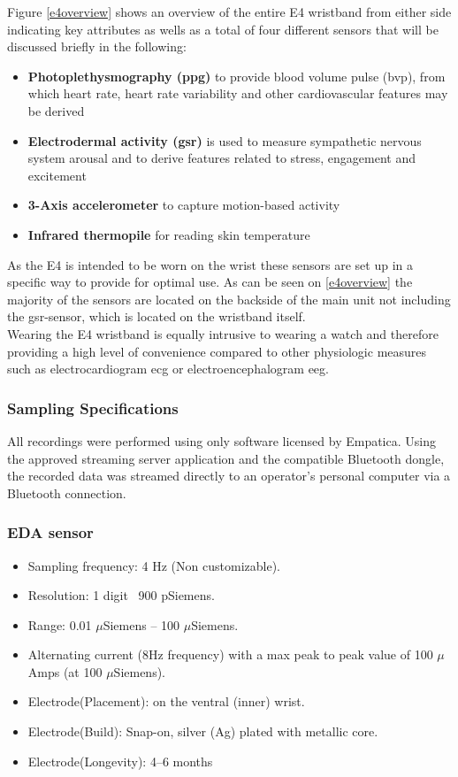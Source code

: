 Figure \ref{e4overview} shows an overview of the entire E4 wristband from either side indicating key attributes as wells as a total of four different sensors that will be discussed briefly in the following:

\begin{itemize}
\item \textbf{Photoplethysmography (\gls{ppg})} to provide blood volume pulse (\gls{bvp}), from which heart rate, heart rate variability and other cardiovascular features may be derived
\item \textbf{Electrodermal activity (\gls{gsr})} is used to measure sympathetic nervous system arousal and to derive features related to stress, engagement and excitement
\item \textbf{3-Axis accelerometer} to capture motion-based activity
\item \textbf{Infrared thermopile} for reading skin temperature
\end{itemize}

As the E4 is intended to be worn on the wrist these sensors are set up in a specific way to provide for optimal use. As can be seen on \ref{e4overview} the majority of the sensors are located on the backside of the main unit not including the \gls{gsr}-sensor, which is located on the wristband itself.\\
Wearing the E4 wristband is equally intrusive to wearing a watch and therefore providing a high level of convenience compared to other physiologic measures such as electrocardiogram \gls{ecg} or electroencephalogram \gls{eeg}.\\

\subsubsection{Sampling Specifications}
All recordings were performed using only software licensed by Empatica. Using the approved streaming server application and the compatible Bluetooth dongle, the recorded data was streamed directly to an operator's personal computer via a Bluetooth connection. 

\subsubsection{EDA sensor}
\begin{itemize}
\item Sampling frequency: 4 Hz (Non customizable).
\item Resolution: 1 digit ~900 pSiemens.
\item Range: 0.01 $\mu$Siemens – 100 $\mu$Siemens.
\item Alternating current (8Hz frequency) with a
max peak to peak value of 100 $\mu$Amps (at 100
$\mu$Siemens).
\item Electrode(Placement): on the ventral (inner) wrist.
\item Electrode(Build): Snap-on, silver (Ag) plated with metallic core.
\item Electrode(Longevity): 4–6 months
\end{itemize}

